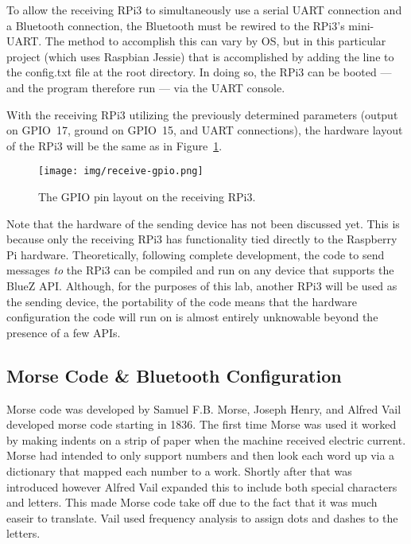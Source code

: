 \documentclass[11pt]{article}
\begin{document}
To allow the receiving RPi3 to simultaneously use a serial UART connection and a Bluetooth connection, the Bluetooth must be rewired to the RPi3's mini-UART.
The method to accomplish this can vary by OS, but in this particular project (which uses Raspbian Jessie) that is accomplished by adding the line  to the config.txt file at the root directory.
In doing so, the RPi3 can be booted --- and the program therefore run --- via the UART console.


With the receiving RPi3 utilizing the previously determined parameters (output on GPIO~17, ground on GPIO~15, and UART connections), the hardware layout of the RPi3 will be the same as in Figure~\ref{fig:receive-gpio}.


\begin{figure}[ht]
    \centering
    \texttt{[image: img/receive-gpio.png]}
    \caption{The GPIO pin layout on the receiving RPi3.}
    \label{fig:receive-gpio}
\end{figure}


Note that the hardware of the sending device has not been discussed yet.
This is because only the receiving RPi3 has functionality tied directly to the Raspberry Pi hardware.
Theoretically, following complete development, the code to send messages \emph{to} the RPi3 can be compiled and run on any device that supports the BlueZ API.
Although, for the purposes of this lab, another RPi3 will be used as the sending device, the portability of the code means that the hardware configuration the code will run on is almost entirely unknowable beyond the presence of a few APIs.


\subsection{Morse Code \& Bluetooth Configuration}
\label{sub:morse_code_&_bluetooth_configuration}

Morse code was developed by Samuel F.B. Morse, Joseph Henry, and Alfred Vail developed morse code starting in 1836.
The first time Morse was used it worked by making indents on a strip of paper when the machine received electric current.
Morse had intended to only support numbers and then look each word up via a dictionary that mapped each number to a work.
Shortly after that was introduced however Alfred Vail expanded this to include both special characters and letters.
This made Morse code take off due to the fact that it was much easeir to translate.
Vail used frequency analysis to assign dots and dashes to the letters.
\end{document}

